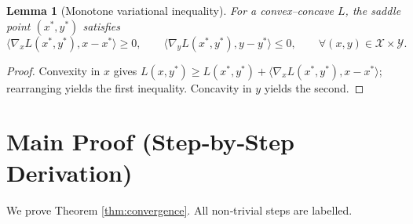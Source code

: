 \documentclass{article}
\newtheorem{lemma}{Lemma}
\begin{document}
\begin{lemma}[Monotone variational inequality]\label{lem:vi}
For a convex–concave $L$, the saddle point $(x^*,y^*)$ satisfies
\[
\langle \nabla_x L(x^*,y^*),x-x^*\rangle
\ge 0,\qquad
\langle \nabla_y L(x^*,y^*),y-y^*\rangle
\le 0,\qquad\forall (x,y)\in\mathcal{X}\times\mathcal{Y}.
\tag{4}
\]
\end{lemma}
\begin{proof}
Convexity in $x$ gives $L(x,y^*)\ge L(x^*,y^*)+\langle\nabla_x L(x^*,y^*),x-x^*\rangle$; rearranging yields the first inequality. Concavity in $y$ yields the second.
\end{proof}

\section*{Main Proof (Step‑by‑Step Derivation)}
We prove Theorem \ref{thm:convergence}. All non‑trivial steps are labelled.
\end{document}
